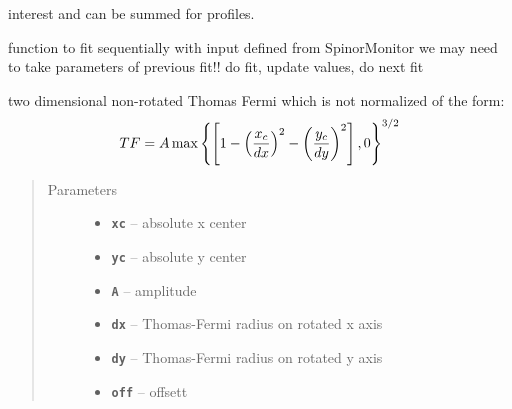 \documentclass[letterpaper,10pt,english]{sphinxmanual}
\begin{document}
\begin{fulllineitems}
\begin{fulllineitems}
\begin{quote}
\begin{description}
\end{description}\end{quote}

interest and can be summed for profiles.

\end{fulllineitems}


\begin{fulllineitems}
\label{fit_object:Fitobject.fit_object.multiple_fits}
function to fit sequentially with input defined from SpinorMonitor
we may need to take parameters of previous fit!!
do fit, update values, do next fit

\end{fulllineitems}


\begin{fulllineitems}
\label{fit_object:Fitobject.fit_object.partial_TF_2D}
two dimensional non-rotated Thomas Fermi which is not normalized of the form:
\begin{gather}
\begin{split}TF = A \max\left\{\left[1-\left(\frac{x_c}{dx}\right)^2-\left(\frac{y_c}{dy}\right)^2\right],0\right\}^{3/2}\end{split}\notag
\end{gather}\begin{quote}\begin{description}
\item[{Parameters}] \leavevmode\begin{itemize}
\item {} 
\textbf{\texttt{xc}} -- absolute x center

\item {} 
\textbf{\texttt{yc}} -- absolute y center

\item {} 
\textbf{\texttt{A}} -- amplitude

\item {} 
\textbf{\texttt{dx}} -- Thomas-Fermi radius on rotated x axis

\item {} 
\textbf{\texttt{dy}} -- Thomas-Fermi radius on rotated y axis

\item {} 
\textbf{\texttt{off}} -- offsett


\end{itemize}
\end{description}
\end{quote}
\end{fulllineitems}
\end{fulllineitems}
\end{document}
